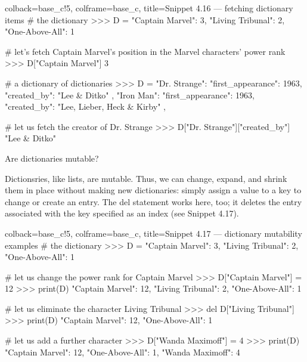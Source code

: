 \documentclass[a4paper,11pt]{book}
\numberwithin{figure}{chapter}
\numberwithin{table}{chapter}
\newcommand{\question}[1]{%
    \begin{tcolorbox}[colback=comp_c!10,colframe=comp_c,sidebyside align=top,width=\linewidth,before skip=1ex]
        #1
    \end{tcolorbox}%
    \switchcolumn%
}
\newcommand{\note}[1]{%
    \begin{tcolorbox}[colback=white!0,colframe=white!10,width=\linewidth,before skip=1ex]
        #1
    \end{tcolorbox}         
}
\begin{document}
\begin{pythoncode}[linenos=true,]{colback=base_c!5, colframe=base_c, title=\sffamily Snippet 4.16 --- fetching dictionary items}
# the dictionary 
>>> D = {"Captain Marvel": 3, "Living Tribunal": 2, "One-Above-All": 1}

# let's fetch Captain Marvel's position in the Marvel characters' power rank
>>> D["Captain Marvel"]
3

# a dictionary of dictionaries
>>> D = {
	"Dr. Strange": {
		"first_appearance": 1963,
		"created_by": "Lee & Ditko"
		},
	"Iron Man": {
		"first_appearance": 1963,
		"created_by": "Lee, Lieber, Heck & Kirby"
		},
    } 

# let us fetch the creator of Dr. Strange 
>>> D["Dr. Strange"]["created_by"]
"Lee & Ditko"
\end{pythoncode}

\begin{paracol}{2}
\question{\raggedright Are dictionaries mutable?}
\note{Dictionsries, like lists, are mutable. Thus, we can change, expand, and shrink them in place without making new dictionaries: simply assign a value to a key to change or create an entry. The del statement works here, too; it deletes the entry associated with the key specified as an index (see Snippet 4.17).}
\end{paracol}
\clearpage

\begin{pythoncode}[linenos=true,]{colback=base_c!5, colframe=base_c, title=\sffamily Snippet 4.17 --- dictionary mutability examples}
# the dictionary 
>>> D = {"Captain Marvel": 3, "Living Tribunal": 2, "One-Above-All": 1}

# let us change the power rank for Captain Marvel
>>> D["Captain Marvel"] = 12
>>> print(D)
{"Captain Marvel": 12, "Living Tribunal": 2, "One-Above-All": 1}

# let us eliminate the character Living Tribunal 
>>> del D["Living Tribunal"]
>>> print(D)
{"Captain Marvel": 12, "One-Above-All": 1}

# let us add a further character 
>>> D["Wanda Maximoff"] = 4
>>> print(D)
{"Captain Marvel": 12, "One-Above-All": 1, "Wanda Maximoff": 4}

\end{pythoncode}
\end{document}
